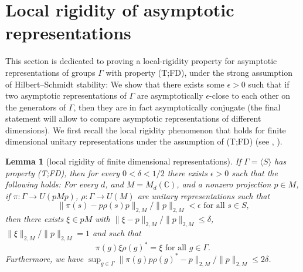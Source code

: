 \documentclass[11pt]{amsart}
\newcommand{\C}{{\mathbb{C}}}
\newtheorem{lemma}[theorem]{Lemma}
\theoremstyle{definition}
\theoremstyle{remark}
\theoremstyle{definition}
\begin{document}
\section{Local rigidity of asymptotic representations}\label{sec:local_rigidity}

This section is dedicated to proving a local-rigidity property for asymptotic representations of groups $\Gamma$ with property (T;FD), under the strong assumption of Hilbert--Schmidt stability:
We show that there exists some $\epsilon>0$ such that if two asymptotic representations of $\Gamma$ are asymptotically $\epsilon$-close to each other on the generators of $\Gamma$, then they are in fact asymptotically conjugate (the final statement will allow to compare asymptotic representations of different dimensions).
We first recall the local rigidity phenomenon that holds for finite dimensional unitary representations under the assumption of (T;FD) (see \cite{dlHRV}, \cite{Rapinchuk}).


\begin{lemma}[local rigidity of finite dimensional representations]
\label{lem:T_FD_rigidity_rep}
If  $\Gamma = \langle S \rangle$ has property (T;FD),  then for every $0< \delta<1/2$ there exists $\epsilon> 0$ such that the following holds:
For every $d$, and $M= M_{d}(\C)$, and a nonzero projection $p \in M$, if  $\pi:\Gamma\rightarrow U(p M p)$, $\rho: \Gamma \to U( M )$ are  unitary representations such that
$$\| \pi(s) - p\rho(s) p\|_{2,M} / \|p \|_{2,M}< \epsilon \text{ for all $s \in S$,}$$
then there exists $\xi \in p M$ with $ \| \xi -p \|_{2,M}  / \| p \|_{2,M}\leq \delta $, $\| \xi\|_{2,M} / \| p\|_{2,M} = 1$ and such that 
$$ \pi(g)\xi\rho(g)^* = \xi   \text{ for all $g \in \Gamma$.}$$
Furthermore, we have $\sup_{g \in \Gamma}\| \pi(g)  p\rho(g)^* - p\|_{2,M} / \|p \|_{2,M} \leq 2\delta$.
\end{lemma}
\end{document}
